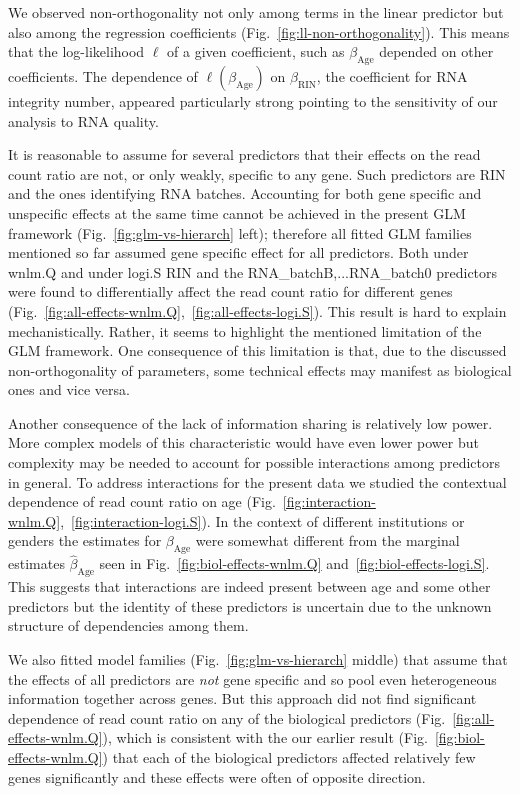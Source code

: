 \documentclass[12pt,letterpaper]{article}
\begin{document}
We observed non-orthogonality not only among terms in the linear predictor but
also among the regression coefficients (Fig.~\ref{fig:ll-non-orthogonality}).
This means that the log-likelihood \(\ell\) of a given coefficient, such as
\(\beta_\mathrm{Age}\) depended on other coefficients.  The dependence of
\(\ell(\beta_\mathrm{Age})\) on \(\beta_\mathrm{RIN}\), the coefficient for
RNA integrity number, appeared particularly strong pointing to the sensitivity
of our analysis to RNA quality.

It is reasonable to assume for several predictors that their effects on the
read count ratio are not, or only weakly, specific to any gene.  Such predictors are RIN
and the ones identifying RNA batches.  Accounting for both gene specific and
unspecific effects at the same time cannot be achieved in the present GLM
framework (Fig.~\ref{fig:glm-vs-hierarch} left); therefore all fitted GLM
families mentioned so far assumed gene specific effect for all predictors.
Both under wnlm.Q and under logi.S RIN and the RNA\_batchB,...RNA\_batch0
predictors were found to differentially affect the read count ratio for
different genes
(Fig.~\ref{fig:all-effects-wnlm.Q},~\ref{fig:all-effects-logi.S}).  This result
is hard to explain mechanistically.  Rather, it seems to highlight the
mentioned limitation of the GLM framework.  One consequence of this limitation
is that, due to the discussed non-orthogonality of parameters, some technical
effects may manifest as biological ones and vice versa.

Another consequence of the lack of information sharing is relatively low
power.  More complex models of this characteristic would have even lower power
but complexity may be needed to account for possible interactions among predictors in
general.  To address interactions for the present data we studied the contextual
dependence of read count ratio on age
(Fig.~\ref{fig:interaction-wnlm.Q},~\ref{fig:interaction-logi.S}).  In the
context of different institutions or genders the estimates for
\(\beta_\mathrm{Age}\) were somewhat different from the marginal estimates
\(\hat\beta_\mathrm{Age}\) seen in Fig.~\ref{fig:biol-effects-wnlm.Q}
and~\ref{fig:biol-effects-logi.S}.  This suggests that interactions are indeed
present between age and some other predictors but the identity of these
predictors is uncertain due to the unknown structure of dependencies among them.

We also fitted model families (Fig.~\ref{fig:glm-vs-hierarch} middle) that
assume that the effects of all predictors are \emph{not} gene specific and so
pool even heterogeneous information together across genes.  But this approach
did not find significant dependence of read count ratio on any of the
biological predictors (Fig.~\ref{fig:all-effects-wnlm.Q}), which is consistent
with the our earlier result (Fig.~\ref{fig:biol-effects-wnlm.Q}) that each of
the biological predictors affected relatively few genes significantly and these
effects were often of opposite direction.
\end{document}
